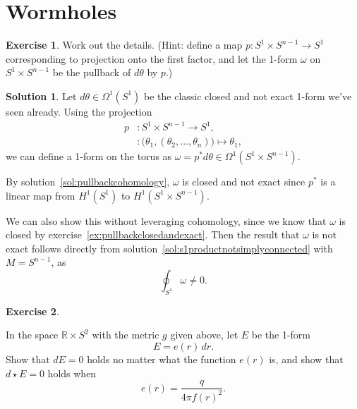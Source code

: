 \documentclass[11pt, a4paper]{report}
\theoremstyle{definition}
\newtheorem{ex}{Exercise}[part]
\newtheorem{sol}{Solution}[part]
\begin{document}
\section{Wormholes}

\begin{ex}

Work out the details. (Hint: define a map $p: S^1 \times S^{n - 1} \to S^1$ corresponding to projection onto the first factor, and let the 1-form $\omega$ on $S^1 \times S^{n - 1}$ be the pullback of $d\theta$ by $p$.)

\end{ex}

\begin{sol}

Let $d\theta \in \Omega^1(S^1)$ be the classic closed and not exact 1-form we've seen already. Using the projection
\begin{align*}
    p &: S^1 \times S^{n - 1} \to S^1, \\
      &: \bigl( \theta_1, (\theta_2, \ldots, \theta_n) \bigr) \mapsto \theta_1,
\end{align*}
we can define a 1-form on the torus as $\omega = p^* d\theta \in \Omega^1(S^1 \times S^{n - 1})$.

By solution~\ref{sol:pullbackcohomology}, $\omega$ is closed and not exact since $p^*$ is a linear map from $H^1(S^1)$ to $H^1(S^1 \times S^{n - 1})$.

We can also show this without leveraging cohomology, since we know that $\omega$ is closed by exercise~\ref{ex:pullbackclosedandexact}. Then the result that $\omega$ is not exact follows directly from solution~\ref{sol:s1productnotsimplyconnected} with $M = S^{n - 1}$, as
\[
    \oint_{S^1} \omega \neq 0.
\]

\end{sol}

\begin{ex}\label{ex:vacuumelectrostaticwormhole}

In the space $\mathbb{R} \times S^2$ with the metric $g$ given above, let $E$ be the 1-form
\[
    E = e(r) \, dr.
\]
Show that $dE = 0$ holds no matter what the function $e(r)$ is, and show that $d \star E = 0$ holds when
\[
    e(r) = \frac{q}{4 \pi {f(r)}^2}.
\]

\end{ex}
\end{document}
